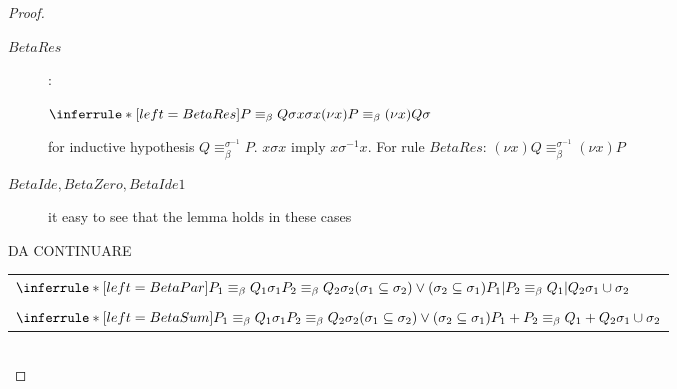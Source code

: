 \begin{lemma}
\begin{proof}
\begin{description}
      \item[$BetaRes$]:
	\begin{center}
	  $\inferrule*[left=BetaRes]{
	      P\equiv_{\beta}Q
	    \\
	      \sigma
	    \\
	      x \sigma x
	  }{
	      (\nu x)P\equiv_{\beta}(\nu x)Q
	    \\
	      \sigma
	  }$	  
	\end{center}
	for inductive hypothesis $Q\equiv_{\beta}^{\sigma^{-1}}P$. $x \sigma x$ imply $x \sigma^{-1} x$. For rule $BetaRes$: $(\nu x)Q\equiv_{\beta}^{\sigma^{-1}}(\nu x)P$
      \item[$BetaIde, BetaZero, BetaIde1$] it easy to see that the lemma holds in these cases
	
    \end{description}
DA CONTINUARE
    \begin{tabular}{l}
      \\
	  $\inferrule*[left=BetaPar]{
	      P_{1}\equiv_{\beta}Q_{1}
	    \\
	      \sigma_{1}
	    \\
	      P_{2}\equiv_{\beta}Q_{2}
	    \\
	      \sigma_{2}
	    \\
	      (\sigma_{1}\subseteq \sigma_{2}) \vee (\sigma_{2}\subseteq \sigma_{1})
	  }{
	      P_{1}|P_{2}\equiv_{\beta}Q_{1}|Q_{2}
	    \\
	      \sigma_{1} \cup \sigma_{2}
	  }$
      \\\\
	  $\inferrule*[left=BetaSum]{
	      P_{1}\equiv_{\beta} Q_{1}
	    \\
	      \sigma_{1}
	    \\
	      P_{2}\equiv_{\beta} Q_{2}
	    \\
	      \sigma_{2}
	    \\
	      (\sigma_{1}\subseteq \sigma_{2}) \vee (\sigma_{2}\subseteq \sigma_{1})
	  }{
	      P_{1}+P_{2}\equiv_{\beta}Q_{1}+Q_{2}
	    \\
	      \sigma_{1} \cup \sigma_{2}
	  }$
      \\
    \end{tabular}
    \\
\end{proof}
\end{lemma}
